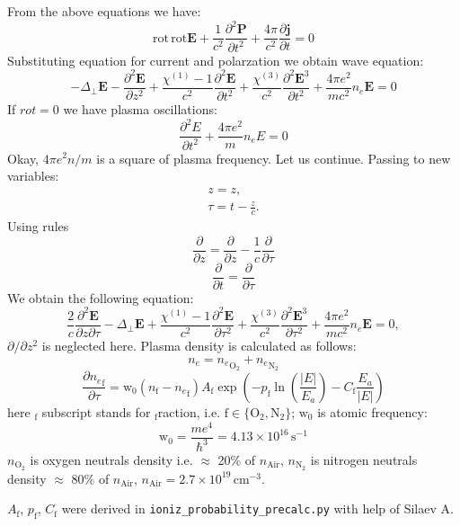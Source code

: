 \documentclass{article}
\newcommand{\dd}{\partial}
\newcommand{\ff}{\frac}
\newcommand{\vv}{\mathbf}
\newcommand{\chiO}{\chi^{(1)}}
\newcommand{\chiT}{\chi^{(3)}}
\begin{document}
From the above equations we have:
\[ \mathrm{rot}\,\mathrm{rot} \vv{E} + \ff{1}{c^2}\ff{\dd^2 \vv P}{\dd t^2}+\ff{4\pi}{c^2}\ff{\dd \vv j}{\dd t}=0 \]
Substituting equation for current and polarzation we obtain wave equation:
\begin{equation}
- \Delta_\perp \vv E -\ff{\dd^2 \vv E}{\dd z^2} + \ff{\chiO - 1}{c^2}\ff{\dd^2 \vv E}{\dd t^2} + \ff{\chiT}{c^2}\ff{\dd^2 \vv E^3}{\dd t^2} +\ff{4\pi e^2}{m c^2} n_e \vv E = 0
\end{equation}
If $rot=0$ we have plasma oscillations:
\begin{equation}
\ff{\dd^2 E}{\dd t^2}+\ff{4\pi e^2}{m} n_e E = 0
\end{equation}
Okay, $4 \pi e^2 n / m$ is a square of plasma frequency. Let us continue.
Passing to new variables:
\begin{eqnarray}
z = z, \\
\tau=t-\frac{z}{c}.
\end{eqnarray}
Using rules
\[ \ff{\dd}{\dd z}=\ff{\dd}{\dd z} -\ff{1}{c}\ff{\dd}{\dd \tau} \]
\[ \ff{\dd}{\dd t}=\ff{\dd}{\dd \tau} \]
We obtain the following equation:
\begin{equation}
\label{eqzt}
\ff{2}{c}\ff{\dd^2 \vv E}{\dd z \dd \tau} - \Delta_\perp \vv E +\ff{\chiO - 1}{c^2}\ff{\dd^2 \vv E}{\dd \tau^2} + \ff{\chiT}{c^2}\ff{\dd^2 \vv E^3}{\dd \tau^2} +\ff{4\pi e^2}{m c^2} n_e \vv E = 0,
\end{equation}
$\dd/\dd z^2$ is neglected here. Plasma density is calculated as follows:
\begin{equation}
n_e = {n_e}_{\mathrm{O}_2} + {n_e}_{\mathrm{N}_2}
\end{equation}
\begin{equation}
\ff{\dd {n_e}_\mathrm{f}}{\dd \tau} = \mathrm{w}_0 (n_\mathrm{f}-{n_e}_\mathrm{f}) A_\mathrm{f} \exp\left(- p_\mathrm{f} \ln\left(\ff{|E|}{E_a}\right) - C_\mathrm{f}\ff{E_a}{|E|} \right)
\end{equation}
here ${}_\mathrm{f}$ subscript stands for ${}_\mathrm{f}$raction, i.e. $\mathrm{f} \in \{ \mathrm{O}_2, \mathrm{N}_2 \}$; $\mathrm{w}_0$ is atomic frequency:
\[ \mathrm{w}_0 = \ff{m e^4} {\hbar^3} = 4.13 \times 10^{16} \, \mathrm{s}^{-1} \]
$n_{\mathrm{O}_2}$ is oxygen neutrals density i.e. $\approx$ 20\% of $n_\mathrm{Air}$, $n_{\mathrm{N}_2}$ is nitrogen neutrals density $\approx$ 80\% of $n_\mathrm{Air}$, $n_\mathrm{Air}=2.7\times 10^{19}\,\mathrm{cm}^{-3}$.

\noindent
$A_\mathrm{f}$, $p_\mathrm{f}$, $C_\mathrm{f}$ were derived in \verb=ioniz_probability_precalc.py= with help of Silaev A.
\end{document}
